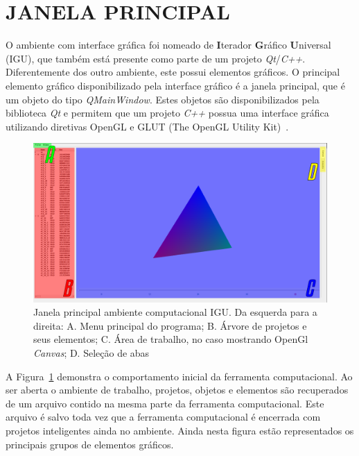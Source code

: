 \section{JANELA PRINCIPAL}\label{sec:janela}

O ambiente com interface gráfica foi nomeado de \textbf{I}terador \textbf{G}ráfico \textbf{U}niversal (IGU), que também está presente como parte de um projeto \textit{Qt}/\textit{C++}. Diferentemente dos outro ambiente, este possui elementos gráficos. O principal elemento gráfico disponibilizado pela interface gráfico é a janela principal, que é um objeto do tipo \textit{QMainWindow}. Estes objetos são disponibilizados pela biblioteca \textit{Qt} e permitem que um projeto \textit{C++} possua uma interface gráfica utilizando diretivas OpenGL e GLUT (The OpenGL Utility Kit)~\cite{OpenGL}.

\begin{figure}[!htbp]
	\centering
	\includegraphics[width=\linewidth]{Figures/IGU_001a.png}
	\caption{Janela principal ambiente computacional IGU. Da esquerda para a direita: A. Menu principal do programa; B. Árvore de projetos e seus elementos; C. Área de trabalho, no caso mostrando OpenGl \textit{Canvas}; D. Seleção de abas}
	\label{fig:UI}
\end{figure}

A Figura~\ref{fig:UI} demonstra o comportamento inicial da ferramenta computacional. Ao ser aberta o ambiente de trabalho, projetos, objetos e elementos são recuperados de um arquivo contido na mesma parte da ferramenta computacional. Este arquivo é salvo toda vez que a ferramenta computacional é encerrada com projetos inteligentes ainda no ambiente. Ainda nesta figura estão representados os principais grupos de elementos gráficos.

